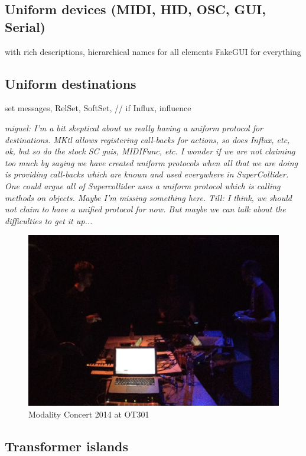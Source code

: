 \documentclass{article}
\begin{document}
\subsection{ Uniform devices (MIDI, HID, OSC, GUI, Serial) }

		with rich descriptions, hierarchical names for all elements
		FakeGUI for everything


\subsection{ Uniform destinations}

		set messages, RelSet, SoftSet, // if Influx, influence

\emph{ miguel: I'm a bit skeptical about us really having a uniform protocol for destinations. MKtl allows registering call-backs for actions, so does Influx, etc, ok, but so do the stock SC guis, MIDIFunc, etc.  I wonder if we are not claiming too much by saying we have created uniform protocols when all that we are doing is providing call-backs which are known and used everywhere in SuperCollider. One could argue all of Supercollider uses a uniform protocol which is calling methods on objects. Maybe I'm missing something here.
}
 \emph{Till: I think, we should not claim to have a unified protocol for now. But maybe we can talk about the difficulties to get it up...}
		
\begin{figure}[h]
	\centering
		\includegraphics[width=.9\columnwidth]{../media/20140405-IMG_1691.jpg}
	\caption{Modality Concert 2014 at OT301}
	\label{fig:media_20140405-IMG_1691}
\end{figure}

\subsection{Transformer islands} 
\end{document}
